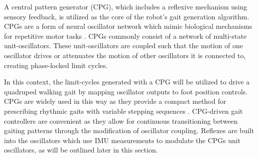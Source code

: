 		A central pattern generator (CPG), which includes a reflexive mechanism using sensory feedback, is utilized as the core of the robot's gait generation algorithm. CPGs are a form of neural oscillator network which mimic biological mechanisms for repetitive motor tasks \cite{Ijspeert2008,Collins1993}. CPGs commonly consist of a network of multi-state unit-oscillators. These unit-oscillators are coupled such that the motion of one oscillator drives or attenuates the motion of other oscillators it is connected to, creating phase-locked limit cycles.

		In this context, the limit-cycles generated with a CPG will be utilized to drive a quadruped  walking gait by mapping oscillator outputs to foot position controls. CPGs are widely used in this way as they provide a compact method for prescribing rhythmic gaits with variable stepping sequences 
		\cite{
			Righetti2006,
	 		Castro2008,
			Li2014
		}. 
		CPG-driven gait controllers are convenient as they allow for continuous transitioning between gaiting patterns through the modification of oscillator coupling. Reflexes are built into the oscillators which use IMU measurements to modulate the CPGs unit oscillators, as will be outlined later in this section.

